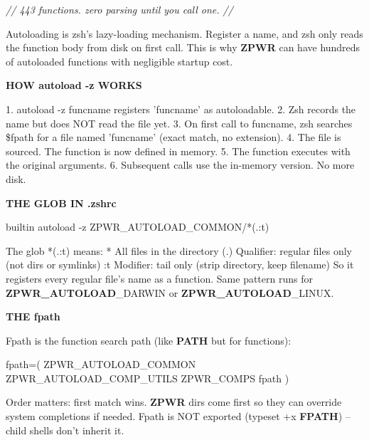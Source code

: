 \documentclass[11pt,a4paper,twoside]{book}
\begin{document}
{\small\itshape\color{dimtext} // 443 functions. zero parsing until you call one. //}

Autoloading is zsh's lazy-loading mechanism. Register a name, and zsh only reads the function body from disk on first call. This is why \textbf{ZPWR} can have hundreds of autoloaded functions with negligible startup cost.


\vspace{12pt}
{\bfseries\color{neonyellow} HOW autoload -z WORKS}\vspace{4pt}

1. autoload -z funcname registers 'funcname' as autoloadable. 2. Zsh records the name but does NOT read the file yet. 3. On first call to funcname, zsh searches \$fpath for a file named 'funcname' (exact match, no extension). 4. The file is sourced. The function is now defined in memory. 5. The function executes with the original arguments. 6. Subsequent calls use the in-memory version. No more disk.


\vspace{12pt}
{\bfseries\color{neonyellow} THE GLOB IN .zshrc}\vspace{4pt}

\begin{codebox}
\color{neongreen}builtin autoload -z ZPWR\_AUTOLOAD\_COMMON/*(.:t)\\
\end{codebox}

The glob *(.:t) means: *    All files in the directory (.)  Qualifier: regular files only (not dirs or symlinks) :t   Modifier: tail only (strip directory, keep filename) So it registers every regular file's name as a function. Same pattern runs for \textbf{ZPWR\_AUTOLOAD}\_DARWIN or \textbf{ZPWR\_AUTOLOAD}\_LINUX.


\vspace{12pt}
{\bfseries\color{neonyellow} THE fpath}\vspace{4pt}

Fpath is the function search path (like \textbf{PATH} but for functions):

\begin{codebox}
\color{neongreen}fpath=( ZPWR\_AUTOLOAD\_COMMON ZPWR\_AUTOLOAD\_COMP\_UTILS ZPWR\_COMPS fpath )\\
\end{codebox}

Order matters: first match wins. \textbf{ZPWR} dirs come first so they can override system completions if needed. Fpath is NOT exported (typeset +x \textbf{FPATH}) -- child shells don't inherit it.
\end{document}

